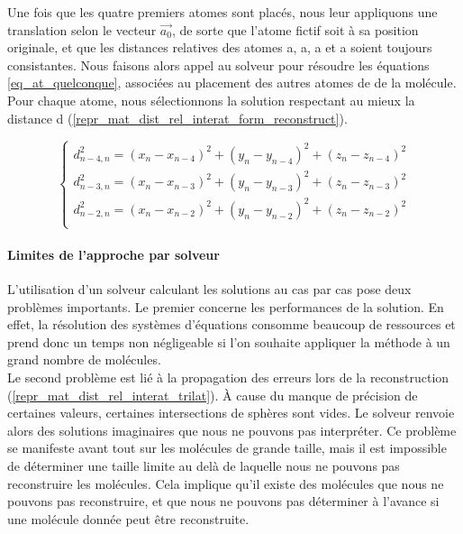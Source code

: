 \par Une fois que les quatre premiers atomes sont placés, nous leur appliquons une translation selon le vecteur $\vec{a_0}$, de sorte que l'atome fictif soit à sa position originale, et que les distances relatives des atomes a, a, a et a soient toujours consistantes. Nous faisons alors appel au solveur pour résoudre les équations \eqref{eq_at_quelconque}, associées au placement des autres atomes de de la molécule. Pour chaque atome, nous sélectionnons la solution respectant au mieux la distance d (\ref{repr_mat_dist_rel_interat_form_reconstruct}).


\begin{equation}
	\left \{
   	\begin{array}{l}
      d_{n-4,n}^2=(x_n-x_{n-4})^2 + (y_n-y_{n-4})^2 + (z_n-z_{n-4})^2\\
	  d_{n-3,n}^2=(x_n-x_{n-3})^2 + (y_n-y_{n-3})^2 + (z_n-z_{n-3})^2\\
      d_{n-2,n}^2=(x_n-x_{n-2})^2 + (y_n-y_{n-2})^2 + (z_n-z_{n-2})^2\\
   	\end{array}
   	\right .
	\label{eq_at_quelconque}
\end{equation}
	

\paragraph{Limites de l'approche par solveur} L'utilisation d'un solveur calculant les solutions au cas par cas pose deux problèmes importants. Le premier concerne les performances de la solution. En effet, la résolution des systèmes d'équations consomme beaucoup de ressources et prend donc un temps non négligeable si l'on souhaite appliquer la méthode à un grand nombre de molécules.\\
Le second problème est lié à la propagation des erreurs lors de la reconstruction (\ref{repr_mat_dist_rel_interat_trilat}). À cause du manque de précision de certaines valeurs, certaines intersections de sphères sont vides. Le solveur renvoie alors des solutions imaginaires que nous ne pouvons pas interpréter. Ce problème se manifeste avant tout sur les molécules de grande taille, mais il est impossible de déterminer une taille limite au delà de laquelle nous ne pouvons pas reconstruire les molécules. Cela implique qu'il existe des molécules que nous ne pouvons pas reconstruire, et que nous ne pouvons pas déterminer à l'avance si une molécule donnée peut être reconstruite.


